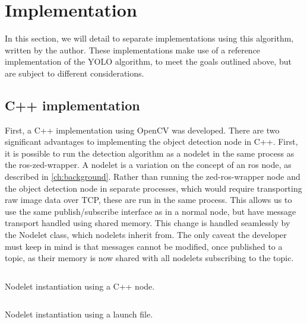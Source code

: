 \documentclass[\rootfolder/main.tex]{subfiles}
\begin{document}

\section{Implementation}

In this section, we will detail to separate implementations using this algorithm, written by the author.
These implementations make use of a reference implementation of the YOLO algorithm, to meet the goals outlined above, but are subject to different considerations.


\subsection{C++ implementation}

First, a C++ implementation using OpenCV was developed.
There are two significant advantages to implementing the object detection node in C++.
First, it is possible to run the detection algorithm as a nodelet in the same process as the ros-zed-wrapper.
A nodelet is a variation on the concept of an \acrshort{ros} node, as described in \cref{ch:background}.
Rather than running the zed-ros-wrapper node and the object detection node in separate processes, which would require transporting raw image data over TCP, these are run in the same process.
This allows us to use the same publish/subscribe interface as in a normal node, but have message transport handled using shared memory.
This change is handled seamlessly by the Nodelet class, which nodelets inherit from.
The only caveat the developer must keep in mind is that messages cannot be modified, once published to a topic, as their memory is now shared with all nodelets subscribing to the topic.

\begin{listing}
    \inputminted{cpp}{\rootfolder/Chapters/Chapter5/Listings/object_detector_node.cpp}
    \caption{Nodelet instantiation using a C++ node.}
    \label{lst:detection-node-cpp}
\end{listing}

\begin{listing}
    \inputminted{xml}{\rootfolder/Chapters/Chapter5/Listings/ros_dnn.launch}
    \caption{Nodelet instantiation using a launch file.}
    \label{lst:detection-node-launch}
\end{listing}
\end{document}

